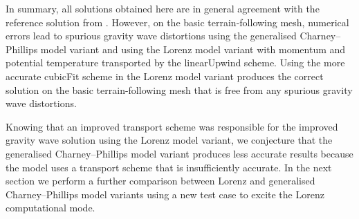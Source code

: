 In summary, all solutions obtained here are in general agreement with the reference solution from \citet{melvin2010}.
However, on the basic terrain-following mesh, numerical errors lead to spurious gravity wave distortions using the generalised Charney--Phillips model variant and using the Lorenz model variant with momentum and potential temperature transported by the linearUpwind scheme.
Using the more accurate cubicFit scheme in the Lorenz model variant produces the correct solution on the basic terrain-following mesh that is free from any spurious gravity wave distortions.

Knowing that an improved transport scheme was responsible for the improved gravity wave solution using the Lorenz model variant, we conjecture that the generalised Charney--Phillips model variant produces less accurate results because the model uses a transport scheme that is insufficiently accurate.
In the next section we perform a further comparison between Lorenz and generalised Charney--Phillips model variants using a new test case to excite the Lorenz computational mode.

